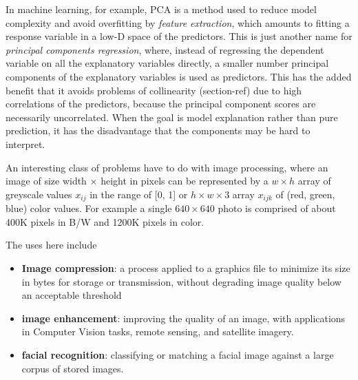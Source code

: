 \documentclass[
  letterpaper,
  10pt,
  krantz2]{krantz}
\providecommand{\tightlist}{%
  \setlength{\itemsep}{0pt}\setlength{\parskip}{0pt}}\usepackage{longtable,booktabs,array}
\begin{document}
{\begin{tcolorbox}[enhanced jigsaw, colback=white, titlerule=0mm, toprule=.15mm, opacityback=0, leftrule=.75mm, opacitybacktitle=0.6, left=2mm, arc=.35mm, colframe=quarto-callout-note-color-frame, breakable, bottomtitle=1mm, toptitle=1mm, title=\textcolor{quarto-callout-note-color}{\faInfo}\hspace{0.5em}{Machine learning uses}, rightrule=.15mm, bottomrule=.15mm, coltitle=black, colbacktitle=quarto-callout-note-color!10!white]

In machine learning, for example, PCA is a method used to reduce model
complexity and avoid overfitting by \emph{feature extraction}, which
amounts to fitting a response variable in a low-D space of the
predictors. This is just another name for \emph{principal components
regression}, where, instead of regressing the dependent variable on all
the explanatory variables directly, a smaller number principal
components of the explanatory variables is used as predictors. This has
the added benefit that it avoids problems of collinearity (section-ref)
due to high correlations of the predictors, because the principal
component scores are necessarily uncorrelated. When the goal is model
explanation rather than pure prediction, it has the disadvantage that
the components may be hard to interpret.

\end{tcolorbox}

An interesting class of problems have to do with image processing, where
an image of size width \(\times\) height in pixels can be represented by
a \(w \times h\) array of greyscale values \(x_{ij}\) in the range of
{[}0, 1{]} or \(h \times w \times 3\) array \(x_{ijk}\) of (red, green,
blue) color values. For example a single \(640 \times 640\) photo is
comprised of about 400K pixels in B/W and 1200K pixels in color.

The uses here include

\begin{itemize}
\tightlist
\item
  \textbf{Image compression}: a process applied to a graphics file to
  minimize its size in bytes for storage or transmission, without
  degrading image quality below an acceptable threshold
\item
  \textbf{image enhancement}: improving the quality of an image, with
  applications in Computer Vision tasks, remote sensing, and satellite
  imagery.
\item
  \textbf{facial recognition}: classifying or matching a facial image
  against a large corpus of stored images.
\end{itemize}

}
\end{document}
